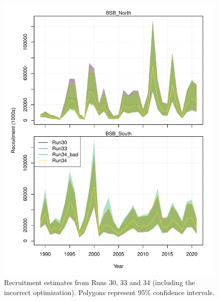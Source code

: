 \documentclass[
]{article}
\begin{document}
\begin{figure}

{\centering \includegraphics{bsb_models_wp_files/figure-latex/R-compare-1} 

}

\caption{Recruitment estimates from Runs 30, 33 and 34 (including the incorrect optimization). Polygons represent 95\% confidence intervals.}\label{fig:R-compare}
\end{figure}
\end{document}
